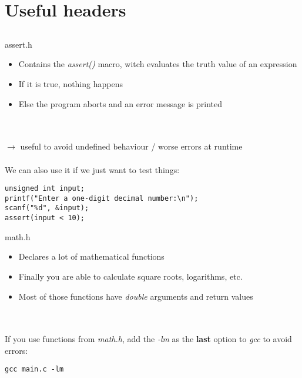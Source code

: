 \section{Useful headers}
\subsection{}
\begin{frame}[fragile]{assert.h}
	 \begin{itemize}
	 	\item Contains the \textit{assert()} macro, witch evaluates the truth value of an expression
	 	\item If it is true, nothing happens
	 	\item Else the program aborts and an error message is printed
	 \end{itemize} \ \\ \ \\
	 $\rightarrow$ useful to avoid undefined behaviour / worse errors at runtime \\ \ \\
	 We can also use it if we just want to test things:
	 \begin{lstlisting}[numbers=none]
unsigned int input;
printf("Enter a one-digit decimal number:\n");
scanf("%d", &input);
assert(input < 10);
\end{lstlisting}
\end{frame}
\begin{frame}[fragile]{math.h}
	\begin{itemize}
		\item Declares a lot of mathematical functions
		\item Finally you are able to calculate square roots, logarithms, etc.
		\item Most of those functions have \textit{double} arguments and return values
	\end{itemize} \ \\ \ \\
	If you use functions from \textit{math.h}, add the \textit{-lm} as the \textbf{last} option to \textit{gcc} to avoid errors:
	\begin{lstlisting}[numbers=none]
gcc main.c -lm
\end{lstlisting}
\end{frame}
